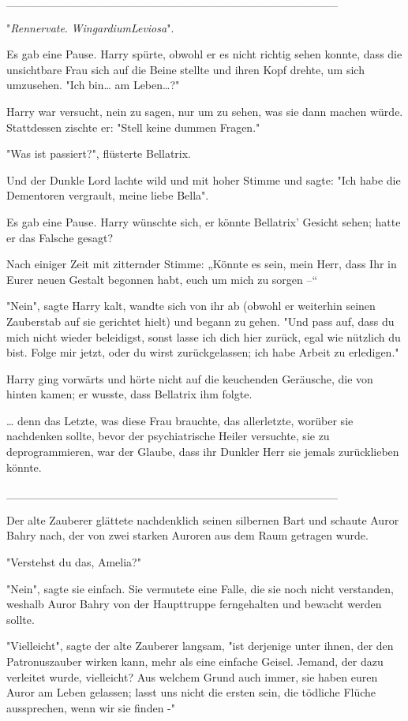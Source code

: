 {\_\_\_\_\_\_\_\_\_\_\_\_\_\_\_\_\_\_\_\_\_\_\_\_\_\_\_\_\_\_\_\_\_\_\_\_\_\_\_\_

"\emph{Rennervate}. \emph{WingardiumLeviosa}".

Es gab eine Pause. Harry spürte, obwohl er es nicht richtig sehen konnte, dass die unsichtbare Frau sich auf die Beine stellte und ihren Kopf drehte, um sich umzusehen. "Ich bin… am Leben…?"

Harry war versucht, nein zu sagen, nur um zu sehen, was sie dann machen würde. Stattdessen zischte er: "Stell keine dummen Fragen."

"Was ist passiert?", flüsterte Bellatrix.

Und der Dunkle Lord lachte wild und mit hoher Stimme und sagte: "Ich habe die Dementoren vergrault, meine liebe Bella".

Es gab eine Pause. Harry wünschte sich, er könnte Bellatrix' Gesicht sehen; hatte er das Falsche gesagt?

Nach einiger Zeit mit zitternder Stimme: „Könnte es sein, mein Herr, dass Ihr in Eurer neuen Gestalt begonnen habt, euch um mich zu sorgen --“

"Nein", sagte Harry kalt, wandte sich von ihr ab (obwohl er weiterhin seinen Zauberstab auf sie gerichtet hielt) und begann zu gehen. "Und pass auf, dass du mich nicht wieder beleidigst, sonst lasse ich dich hier zurück, egal wie nützlich du bist. Folge mir jetzt, oder du wirst zurückgelassen; ich habe Arbeit zu erledigen."

Harry ging vorwärts und hörte nicht auf die keuchenden Geräusche, die von hinten kamen; er wusste, dass Bellatrix ihm folgte.

… denn das Letzte, was diese Frau brauchte, das allerletzte, worüber sie nachdenken sollte, bevor der psychiatrische Heiler versuchte, sie zu deprogrammieren, war der Glaube, dass ihr Dunkler Herr sie jemals zurücklieben könnte.

\_\_\_\_\_\_\_\_\_\_\_\_\_\_\_\_\_\_\_\_\_\_\_\_\_\_\_\_\_\_\_\_\_\_\_\_\_\_\_\_

Der alte Zauberer glättete nachdenklich seinen silbernen Bart und schaute Auror Bahry nach, der von zwei starken Auroren aus dem Raum getragen wurde.

"Verstehst du das, Amelia?"

"Nein", sagte sie einfach. Sie vermutete eine Falle, die sie noch nicht verstanden, weshalb Auror Bahry von der Haupttruppe ferngehalten und bewacht werden sollte.

"Vielleicht", sagte der alte Zauberer langsam, "ist derjenige unter ihnen, der den Patronuszauber wirken kann, mehr als eine einfache Geisel. Jemand, der dazu verleitet wurde, vielleicht? Aus welchem Grund auch immer, sie haben euren Auror am Leben gelassen; lasst uns nicht die ersten sein, die tödliche Flüche aussprechen, wenn wir sie finden -"

}
